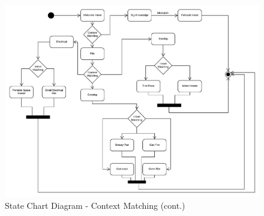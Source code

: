 \documentclass{scrreprt}
\begin{document}
\clearpage

\begin{figure}[ht!]
    \centering
    \includegraphics[angle=90, width=.95\textwidth]{img3/state2.pdf}
    \caption{State Chart Diagram - Context Matching (cont.)}
    \label{fig:statechartdiagram2}
\end{figure}
\end{document}
